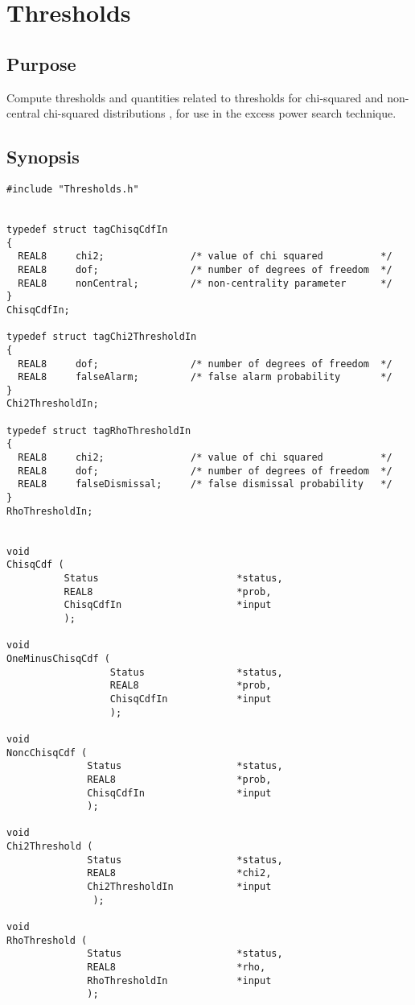 \documentclass{article}
\begin{document}
\section{Thresholds}

\subsection{Purpose}

Compute thresholds and quantities related to thresholds for
chi-squared and non-central chi-squared distributions \cite{ptvf:1992},
for use in the excess power search technique.

 
\subsection{Synopsis}


\begin{verbatim}
#include "Thresholds.h"


typedef struct tagChisqCdfIn
{
  REAL8     chi2;               /* value of chi squared          */
  REAL8     dof;                /* number of degrees of freedom  */
  REAL8     nonCentral;         /* non-centrality parameter      */
}
ChisqCdfIn;

typedef struct tagChi2ThresholdIn
{
  REAL8     dof;                /* number of degrees of freedom  */
  REAL8     falseAlarm;         /* false alarm probability       */
}
Chi2ThresholdIn;

typedef struct tagRhoThresholdIn
{
  REAL8     chi2;               /* value of chi squared          */
  REAL8     dof;                /* number of degrees of freedom  */
  REAL8     falseDismissal;     /* false dismissal probability   */
}
RhoThresholdIn;


void
ChisqCdf (
          Status                        *status,
          REAL8                         *prob,
          ChisqCdfIn                    *input
          );

void
OneMinusChisqCdf (
                  Status                *status,
                  REAL8                 *prob,
                  ChisqCdfIn            *input
                  );

void
NoncChisqCdf (
              Status                    *status,
              REAL8                     *prob,
              ChisqCdfIn                *input
              );

void
Chi2Threshold (
              Status                    *status,
              REAL8                     *chi2,
              Chi2ThresholdIn           *input
               );

void
RhoThreshold (
              Status                    *status,
              REAL8                     *rho,
              RhoThresholdIn            *input
              );

\end{verbatim}
\end{document}

